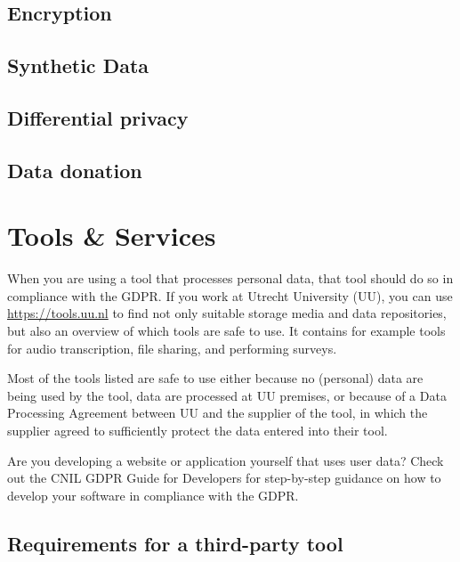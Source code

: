 \documentclass[
]{book}
\begin{document}
\hypertarget{encryption}{%
\section{Encryption}\label{encryption}}

\hypertarget{synthetic-data}{%
\section{Synthetic Data}\label{synthetic-data}}

\hypertarget{differential-privacy}{%
\section{Differential privacy}\label{differential-privacy}}

\hypertarget{data-donation}{%
\section{Data donation}\label{data-donation}}

\hypertarget{tools-and-services}{%
\chapter{Tools \& Services}\label{tools-and-services}}

When you are using a tool that processes personal data, that tool should do so
in compliance with the GDPR. If you work at Utrecht University (UU), you can use
\url{https://tools.uu.nl} to find not only suitable
storage media
and data repositories,
but also an
overview of which tools are safe to use.
It contains for example tools for audio transcription, file sharing, and performing
surveys.

Most of the tools listed are safe to use either because no (personal)
data are being used by the tool, data are processed at UU premises, or because
of a Data Processing Agreement between
UU and the supplier of the tool, in which the supplier agreed to
sufficiently protect the data entered into their tool.

Are you developing a website or application yourself that uses user data? Check
out the CNIL GDPR Guide for Developers
for step-by-step guidance on how to develop your software in compliance with the GDPR.

\hypertarget{tool-requirements}{%
\section{Requirements for a third-party tool}\label{tool-requirements}}
\end{document}
